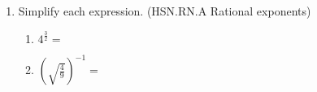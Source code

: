 \documentclass[12pt, twoside]{article}
\begin{document}
\begin{enumerate}
\item Simplify each expression. \hfill (HSN.RN.A Rational exponents)
    \begin{multicols}{2}
    \begin{enumerate}[itemsep=0.5cm]
        \item $\displaystyle 4^{\frac{3}{2}} =$
        \item $\left( \sqrt{\frac{4}{9}} \right)^{-1} =$
    \end{enumerate}
    \end{multicols}


\end{enumerate}
\end{document}
